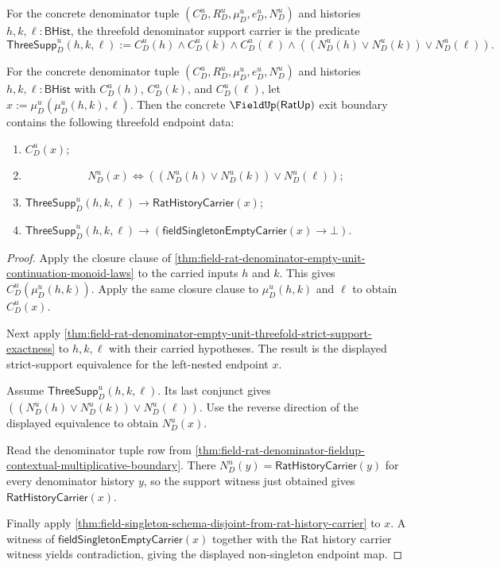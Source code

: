 \begin{definition}
\label{def:ratup-fieldup-threefold-denominator-support-carrier}
For the concrete denominator tuple $(C_D^u,R_D^u,\mu_D^u,e_D^u,N_D^u)$ and
histories $h,k,\ell:\mathsf{BHist}$, the threefold denominator support carrier
is the predicate
$$
\mathsf{ThreeSupp}_D^u(h,k,\ell)
:=
C_D^u(h)\land C_D^u(k)\land C_D^u(\ell)\land
((N_D^u(h)\lor N_D^u(k))\lor N_D^u(\ell)).
$$
\end{definition}

\begin{theorem}
\label{thm:ratup-fieldup-threefold-support-non-singleton-exactness}
For the concrete denominator tuple $(C_D^u,R_D^u,\mu_D^u,e_D^u,N_D^u)$ and
histories $h,k,\ell:\mathsf{BHist}$ with $C_D^u(h)$, $C_D^u(k)$, and
$C_D^u(\ell)$, let $x:=\mu_D^u(\mu_D^u(h,k),\ell)$. Then the concrete
$\FieldUp(\mathsf{RatUp})$ exit boundary contains the following threefold
endpoint data:
\begin{enumerate}
  \item $C_D^u(x)$;
  \item
  $$
  N_D^u(x)
  \Longleftrightarrow
  ((N_D^u(h)\lor N_D^u(k))\lor N_D^u(\ell));
  $$
  \item $\mathsf{ThreeSupp}_D^u(h,k,\ell)\to\mathsf{RatHistoryCarrier}(x)$;
  \item
  $\mathsf{ThreeSupp}_D^u(h,k,\ell)\to
  (\mathsf{fieldSingletonEmptyCarrier}(x)\to\bot)$.
\end{enumerate}
\end{theorem}
\begin{proof}
Apply the closure clause of
\autoref{thm:field-rat-denominator-empty-unit-continuation-monoid-laws} to the
carried inputs $h$ and $k$. This gives $C_D^u(\mu_D^u(h,k))$. Apply the same
closure clause to $\mu_D^u(h,k)$ and $\ell$ to obtain $C_D^u(x)$.

Next apply
\autoref{thm:field-rat-denominator-empty-unit-threefold-strict-support-exactness}
to $h,k,\ell$ with their carried hypotheses. The result is the displayed
strict-support equivalence for the left-nested endpoint $x$.

Assume $\mathsf{ThreeSupp}_D^u(h,k,\ell)$. Its last conjunct gives
$((N_D^u(h)\lor N_D^u(k))\lor N_D^u(\ell))$. Use the reverse direction of the
displayed equivalence to obtain $N_D^u(x)$.

Read the denominator tuple row from
\autoref{thm:field-rat-denominator-fieldup-contextual-multiplicative-boundary}.
There $N_D^u(y)=\mathsf{RatHistoryCarrier}(y)$ for every denominator history
$y$, so the support witness just obtained gives $\mathsf{RatHistoryCarrier}(x)$.

Finally apply
\autoref{thm:field-singleton-schema-disjoint-from-rat-history-carrier} to
$x$. A witness of $\mathsf{fieldSingletonEmptyCarrier}(x)$ together with the
Rat history carrier witness yields contradiction, giving the displayed
non-singleton endpoint map.
\end{proof}

